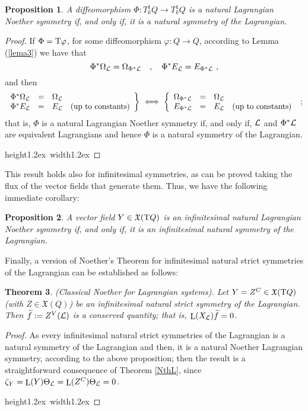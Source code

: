 \documentclass[12pt]{report}
\newtheorem{teor}{Theorem}[chapter]
\newtheorem{prop}[teor]{Proposition}
\def\qed{\ifvmode\removelastskip\fi
{\unskip\nobreak\hfil\penalty50\hbox{}\nobreak\hfil
\hbox{\vrule height1.2ex width1.2ex}\parfillskip=0pt
\finalhyphendemerits=0 \par\smallskip}}
\def\vf{\mathfrak X}
\def\Lag{{\cal L}}
\def\Tan{{\rm T}}
\def\Lie{\mathop{\rm L}\nolimits}
\begin{document}
\begin{prop}
A diffeomorphism $\Phi\colon T^1_kQ\to T^1_kQ$ is a natural Lagrangian Noether symmetry
if, and only if, it is a natural symmetry of the Lagrangian.
\end{prop}
\begin{proof}
If $\Phi=\Tan\varphi$, for some diffeomorphism $\varphi\colon Q\to Q$,
according to Lemma (\ref{lema3}) we have that
$$
\Phi^*\Omega_\Lag=\Omega_{\Phi^*\Lag} \quad , \quad
\Phi^*E_\Lag=E_{\Phi^*\Lag} \ ,
$$
and then
$$
\left. \begin{array}{cccc}
\Phi^*\Omega_\Lag&=&\Omega_\Lag &  \\
\Phi^*E_\Lag&=&E_\Lag &  \mbox{\rm (up to constants)}
\end{array}\right\}
\ \Longleftrightarrow \
\left\{ \begin{array}{cccc}
\Omega_{\Phi^*\Lag}&=&\Omega_\Lag & \\
E_{\Phi^*\Lag}&=&E_\Lag &  \mbox{\rm (up to constants)}
\end{array}\right. \ ;
$$
that is, $\Phi$ is a natural Lagrangian Noether symmetry
if, and only if, $\Lag$ and $\Phi^*\Lag$ are equivalent Lagrangians and hence
$\Phi$ is a natural symmetry of the Lagrangian.
 \\ \qed \end{proof}

This result holds also for  infinitesimal symmetries,
as can be proved taking the flux of  the vector fields that generate them.
Thus, we have the following immediate corollary:

\begin{prop}
A vector field $Y\in\vf (\Tan Q)$ is an infinitesimal natural Lagrangian Noether symmetry
if, and only if, it is an infinitesimal natural symmetry of the Lagrangian.
\end{prop}

Finally, a version of Noether's Theorem
for infinitesimal natural strict symmetries of the Lagrangian can be established as follows:

\begin{teor}
 {\rm (Classical Noether for Lagrangian systems}).
Let  $Y=Z^C\in\vf (\Tan Q)$  (with $Z\in\vf(Q)$)
be an infinitesimal natural strict symmetry of the Lagrangian.
Then $\widetilde  f:=Z^V(\Lag)$ is a conserved quantity; that is, $\Lie (X_\Lag)\widetilde  f=0$.
 \label{NthLs}
\end{teor}
\begin{proof}
As every infinitesimal natural strict symmetries of the Lagrangian
is a natural symmetry of the Lagrangian and then,
it is a natural Noether Lagrangian symmetry, according to the above proposition;
then the result is a straightforward consequence of Theorem \ref{NthL},
since $\zeta_Y=\Lie(Y)\Theta_\Lag=\Lie(Z^C)\Theta_\Lag=0$.
\\ \qed \end{proof}
\end{document}
